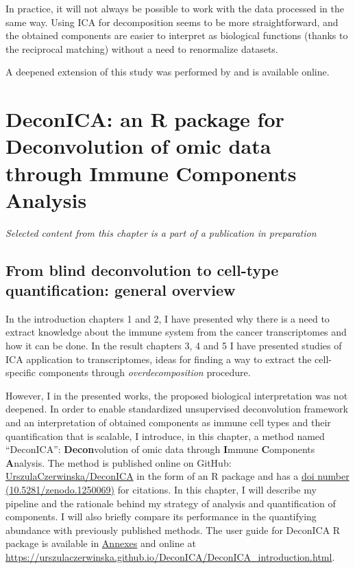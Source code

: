 \documentclass[12pt,]{book}
\theoremstyle{definition}
\theoremstyle{definition}
\theoremstyle{definition}
\theoremstyle{remark}
\begin{document}
In practice, it will not always be possible to work with the data
processed in the same way. Using ICA for decomposition seems to be more
straightforward, and the obtained components are easier to interpret as
biological functions (thanks to the reciprocal matching) without a need
to renormalize datasets.

A deepened extension of this study was performed by \citet{Cantini2018}
and is available online.

\hypertarget{deconica}{%
\chapter{DeconICA: an R package for Deconvolution of omic data through
Immune Components Analysis}\label{deconica}}


\emph{Selected content from this chapter is a part of a publication in
preparation}

\hypertarget{from-blind-deconvolution-to-cell-type-quantification-general-overview}{%
\section{From blind deconvolution to cell-type quantification: general
overview}\label{from-blind-deconvolution-to-cell-type-quantification-general-overview}}

In the introduction chapters 1 and 2, I have presented why there is a
need to extract knowledge about the immune system from the cancer
transcriptomes and how it can be done. In the result chapters 3, 4 and 5
I have presented studies of ICA application to transcriptomes, ideas for
finding a way to extract the cell-specific components through
\emph{overdecomposition} procedure.

However, I in the presented works, the proposed biological
interpretation was not deepened. In order to enable standardized
unsupervised deconvolution framework and an interpretation of obtained
components as immune cell types and their quantification that is
scalable, I introduce, in this chapter, a method named ``DeconICA'':
\textbf{Decon}volution of omic data through \textbf{I}mmune
\textbf{C}omponents \textbf{A}nalysis. The method is published online on
GitHub:
\href{https://github.com/UrszulaCzerwinska/DeconICA}{UrszulaCzerwinska/DeconICA}
in the form of an R package and has a
\href{https://zenodo.org/record/1250070}{doi number
(10.5281/zenodo.1250069)} for citations. In this chapter, I will
describe my pipeline and the rationale behind my strategy of analysis
and quantification of components. I will also briefly compare its
performance in the quantifying abundance with previously published
methods. The user guide for DeconICA R package is available in
\protect\hyperlink{deconicatut}{Annexes} and online at
\url{https://urszulaczerwinska.github.io/DeconICA/DeconICA_introduction.html}.
\end{document}
